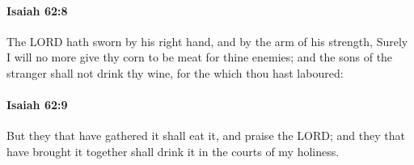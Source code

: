 		\paragraph{Isaiah 62:8} %
			\label{ISAIAH-62-8}

			The LORD hath sworn by his right hand, and by the arm of his strength, Surely I will no more give thy corn to be meat for thine enemies; and the sons of the stranger shall not drink thy wine, for the which thou hast laboured:


		\paragraph{Isaiah 62:9} %
			\label{ISAIAH-62-9}

			But they that have gathered it shall eat it, and praise the LORD; and they that have brought it together shall drink it in the courts of my holiness.


